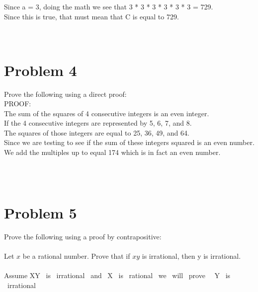 \begin{enumerate}
Since a = 3, doing the math we see that 3 * 3 * 3 * 3 * 3 * 3 = 729. \\

Since this is true, that must mean that C is equal to 729. \\

\\\\

 \newpage
\section*{Problem 4}
Prove the following using a direct proof:
\\

PROOF: \\

The sum of the squares of 4 consecutive integers is an even integer. \\

If the 4 consecutive integers are represented by 5, 6, 7, and 8. \\

The squares of those integers are equal to 25, 36, 49, and 64. \\

Since we are testing to see if the sum of these integers squared is an even number. \\

We add the multiples up to equal 174 which is in fact an even number.


\\\\


 \newpage
\section*{Problem 5}

Prove the following using a proof by contrapositive:
\\\\
Let $x$ be a rational number. Prove that if $xy$ is irrational, then y is irrational.\\\\

Assume \neg XY \ is \ irrational \ and \ X \ is \ rational \ we \ will \ prove \ \neg \ Y \ is \ irrational \\


\end{enumerate}
